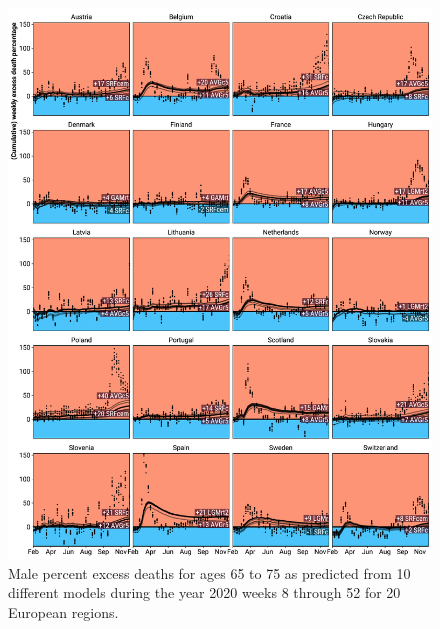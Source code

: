 \documentclass[12pt]{article}
\begin{document}
\begin{appendix}
\begin{figure}
\caption{
Male percent excess deaths for ages 65 to 75 as predicted from 10 different models during the year 2020 weeks 8 through 52 for 20 European regions.}
\label{fig:excessm65to75}
\includegraphics{excess_male__65_75_.pdf}
\end{figure}


\end{appendix}
\end{document}
